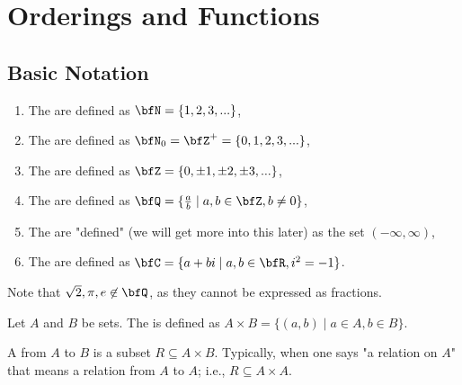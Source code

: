 \chapter{Orderings and Functions}\label{chapter:orderings-and-functions}

\vspace{12pt}

\section{Basic Notation}
    \begin{definition}
        \phantom{a}
        \begin{enumerate}[label = (\arabic*)]
            \item The  are defined as $\bfN = \{1,2,3,...\}$,
            \item The  are defined as $\bfN_0 = \bfZ^{+} = \{0, 1, 2, 3, ...\}$,
            \item The  are defined as $\bfZ = \{0, \pm 1, \pm 2, \pm 3,... \}$,
            \item The  are defined as $\bfQ = \{\frac{a}{b} \mid a,b \in \bfZ, b \neq 0\}$,
            \item The  are "defined" (we will get more into this later) as the set $(-\infty, \infty)$,
            \item The  are defined as $\bfC = \{a + bi \mid a,b \in \bfR, i^2 = -1\}$.
        \end{enumerate}
    \end{definition}
    \begin{example}
        Note that $\sqrt{2}, \pi, e \not\in \bfQ$, as they cannot be expressed as fractions.
    \end{example}

    \begin{definition}
        Let $A$ and $B$ be sets. The  is defined as $A \times B = \{(a,b) \mid a \in A, b \in B\}$.
    \end{definition}

    \begin{definition}
        A  from $A$ to $B$ is a subset $R \subseteq A \times B$. Typically, when one says "a relation on $A$" that means a relation from $A$ to $A$; i.e., $R \subseteq A \times A$.
    \end{definition}

